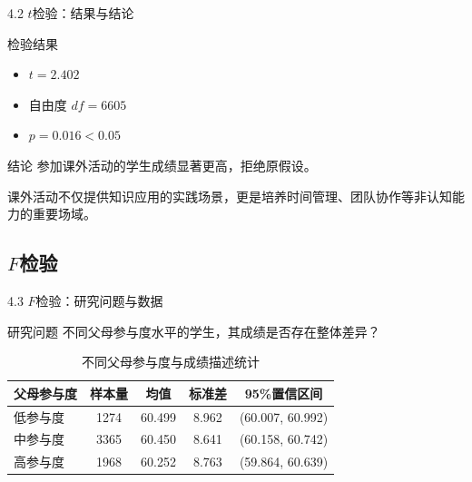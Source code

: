 \documentclass{beamer}
\newenvironment{block*}
  {\setbeamercolor{block title}{bg=white,fg=white}%
   \begin{block}{}}
  {\end{block}}
\begin{document}
\begin{frame}{4.2 \(t\)检验：结果与结论}
    \begin{block}{检验结果}
        \begin{itemize}
            \item \(t = 2.402\)
            \item 自由度 \(df = 6605\)
            \item \(p = 0.016 < 0.05\)
        \end{itemize}
    \end{block}

    \vspace{0.5cm}

    \begin{alertblock}{结论}
        参加课外活动的学生成绩显著更高，拒绝原假设。
    \end{alertblock}

    \vspace{0.3cm}

    \begin{block*}
        课外活动不仅提供知识应用的实践场景，更是培养时间管理、团队协作等非认知能力的重要场域。
    \end{block*}
\end{frame}

\subsection{\(F\)检验}
\begin{frame}{4.3 \(F\)检验：研究问题与数据}
    \begin{block}{研究问题}
        不同父母参与度水平的学生，其成绩是否存在整体差异？
    \end{block}

    \vspace{0.3cm}

    \begin{table}
        \centering
        \renewcommand{\arraystretch}{1.3}
        \begin{tabular}{lcccc}
            \toprule
            父母参与度 & 样本量 & 均值 & 标准差 & 95\%置信区间 \\
            \midrule
            低参与度 & 1274 & 60.499 & 8.962 & (60.007, 60.992) \\
            中参与度 & 3365 & 60.450 & 8.641 & (60.158, 60.742) \\
            高参与度 & 1968 & 60.252 & 8.763 & (59.864, 60.639) \\
            \bottomrule
        \end{tabular}
        \caption{不同父母参与度与成绩描述统计}
    \end{table}
\end{frame}
\end{document}
